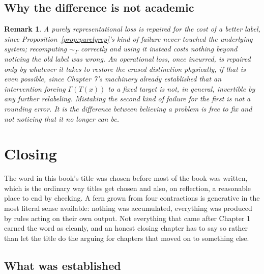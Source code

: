 \documentclass[11pt]{report}
\newtheorem{remark}{Remark}[chapter]
\begin{document}
\section*{Why the difference is not academic}

\begin{remark}
A purely representational loss is repaired for the cost of a better
label, since Proposition~\ref{prop:purelyrep}'s kind of failure never
touched the underlying system; recomputing $\sim_\Gamma$ correctly and
using it instead costs nothing beyond noticing the old label was
wrong. An operational loss, once incurred, is repaired only by
whatever it takes to restore the erased distinction physically, if
that is even possible, since Chapter 7's machinery already
established that an intervention forcing $\Gamma(T(x))$ to a fixed
target is not, in general, invertible by any further relabeling.
Mistaking the second kind of failure for the first is not a rounding
error. It is the difference between believing a problem is free to
fix and not noticing that it no longer can be.
\end{remark}

\chapter{Closing}

The word in this book's title was chosen before most of the book was
written, which is the ordinary way titles get chosen and also, on
reflection, a reasonable place to end by checking. A fern grown from
four contractions is generative in the most literal sense available:
nothing was accumulated, everything was produced by rules acting on
their own output. Not everything that came after Chapter 1 earned the
word as cleanly, and an honest closing chapter has to say so rather
than let the title do the arguing for chapters that moved on to
something else.

\section*{What was established}
\end{document}
